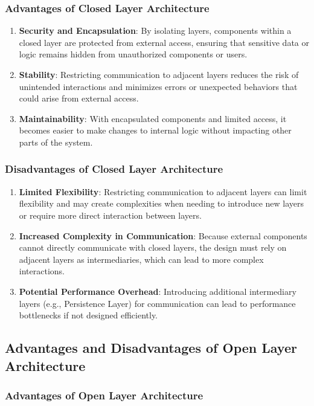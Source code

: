 \subsubsection{Advantages of Closed Layer Architecture}

\begin{enumerate}
	\item \textbf{Security and Encapsulation}: By isolating layers, components within a closed layer are protected from external access, ensuring that sensitive data or logic remains hidden from unauthorized components or users.
	\item \textbf{Stability}: Restricting communication to adjacent layers reduces the risk of unintended interactions and minimizes errors or unexpected behaviors that could arise from external access.
	\item \textbf{Maintainability}: With encapsulated components and limited access, it becomes easier to make changes to internal logic without impacting other parts of the system.
\end{enumerate}

\subsubsection{Disadvantages of Closed Layer Architecture}

\begin{enumerate}
	\item \textbf{Limited Flexibility}: Restricting communication to adjacent layers can limit flexibility and may create complexities when needing to introduce new layers or require more direct interaction between layers.
	\item \textbf{Increased Complexity in Communication}: Because external components cannot directly communicate with closed layers, the design must rely on adjacent layers as intermediaries, which can lead to more complex interactions.
	\item \textbf{Potential Performance Overhead}: Introducing additional intermediary layers (e.g., Persistence Layer) for communication can lead to performance bottlenecks if not designed efficiently.
\end{enumerate}

\subsection{Advantages and Disadvantages of Open Layer Architecture}

\subsubsection{Advantages of Open Layer Architecture}

